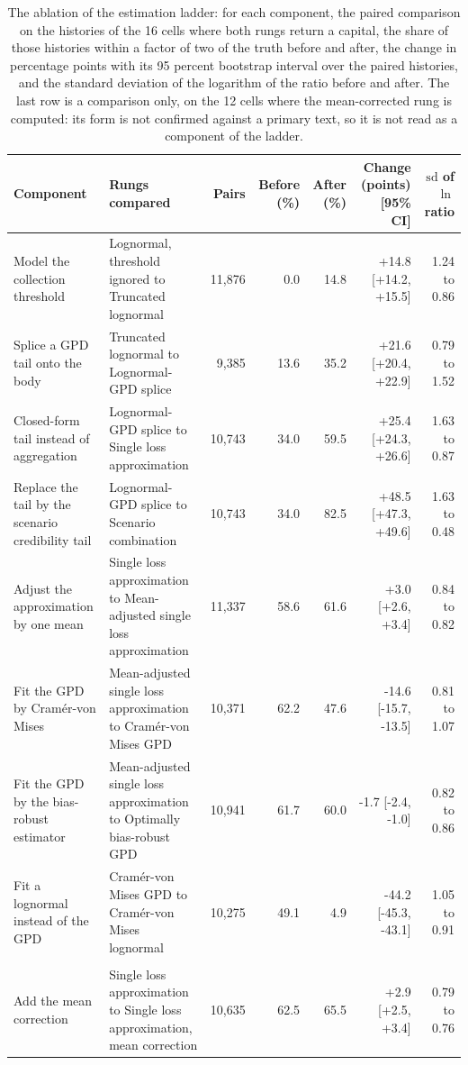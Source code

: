 \begin{table}[htbp]
\centering\footnotesize
\caption{The ablation of the estimation ladder: for each component, the paired comparison on the histories of the 16 cells where both rungs return a capital, the share of those histories within a factor of two of the truth before and after, the change in percentage points with its 95 percent bootstrap interval over the paired histories, and the standard deviation of the logarithm of the ratio before and after. The last row is a comparison only, on the 12 cells where the mean-corrected rung is computed: its form is not confirmed against a primary text, so it is not read as a component of the ladder.}
\label{tab:ablation}
\setlength{\tabcolsep}{3pt}
\begin{tabular}{>{\raggedright\arraybackslash}p{2.3cm}>{\raggedright\arraybackslash}p{2.9cm}rrrrr}
\toprule
Component & Rungs compared & Pairs & Before (\%) & After (\%) & Change (points) [95\% CI] & $\mathrm{sd}$ of $\ln$ ratio \\
\midrule
Model the collection threshold & Lognormal, threshold ignored to Truncated lognormal & 11{,}876 & 0.0 & 14.8 & +14.8 [+14.2, +15.5] & 1.24 to 0.86 \\
Splice a GPD tail onto the body & Truncated lognormal to Lognormal-GPD splice & 9{,}385 & 13.6 & 35.2 & +21.6 [+20.4, +22.9] & 0.79 to 1.52 \\
Closed-form tail instead of aggregation & Lognormal-GPD splice to Single loss approximation & 10{,}743 & 34.0 & 59.5 & +25.4 [+24.3, +26.6] & 1.63 to 0.87 \\
Replace the tail by the scenario credibility tail & Lognormal-GPD splice to Scenario combination & 10{,}743 & 34.0 & 82.5 & +48.5 [+47.3, +49.6] & 1.63 to 0.48 \\
Adjust the approximation by one mean & Single loss approximation to Mean-adjusted single loss approximation & 11{,}337 & 58.6 & 61.6 & +3.0 [+2.6, +3.4] & 0.84 to 0.82 \\
Fit the GPD by Cram\'er-von Mises & Mean-adjusted single loss approximation to Cram\'er-von Mises GPD & 10{,}371 & 62.2 & 47.6 & -14.6 [-15.7, -13.5] & 0.81 to 1.07 \\
Fit the GPD by the bias-robust estimator & Mean-adjusted single loss approximation to Optimally bias-robust GPD & 10{,}941 & 61.7 & 60.0 & -1.7 [-2.4, -1.0] & 0.82 to 0.86 \\
Fit a lognormal instead of the GPD & Cram\'er-von Mises GPD to Cram\'er-von Mises lognormal & 10{,}275 & 49.1 & 4.9 & -44.2 [-45.3, -43.1] & 1.05 to 0.91 \\
\midrule
\multicolumn{7}{p{14cm}}{\emph{Comparison only, in no count of the text (form not confirmed)}} \\
Add the mean correction & Single loss approximation to Single loss approximation, mean correction & 10{,}635 & 62.5 & 65.5 & +2.9 [+2.5, +3.4] & 0.79 to 0.76 \\
\bottomrule
\end{tabular}
\end{table}
